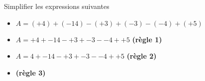 \begin{exemples*1}
Simplifier les expressions suivantes
    \begin{itemize}
        \item[]$A=(+4)+(-14)-(+3)+(-3)-(-4)+(+5)$
        \item[]$A=+4+-14-+3+-3--4++5$  \textbf{(règle 1)}
        \item[]$A=4+-14-+3+-3--4++5$  \textbf{(règle 2)}
        \item[] \textbf{(règle 3)}
    \end{itemize}
\end{exemples*1}
